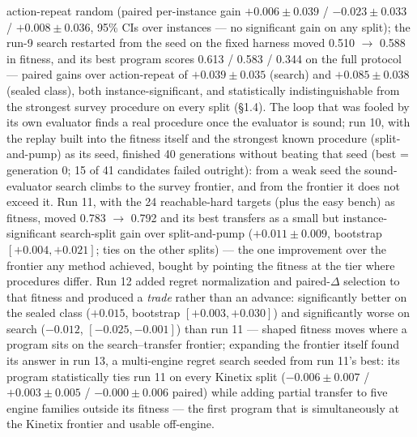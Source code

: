 action-repeat random (paired per-instance gain $+0.006\pm0.039$ / $-0.023\pm0.033$ / $+0.008\pm0.036$, 95\% CIs over instances --- no significant gain on any split); the run-9 search restarted from the seed on the fixed harness moved 0.510 $\to$ 0.588 in fitness, and its best program scores 0.613 / 0.583 / 0.344 on the full protocol --- paired gains over action-repeat of $+0.039\pm0.035$ (search) and $+0.085\pm0.038$ (sealed class), both instance-significant, and statistically indistinguishable from the strongest survey procedure on every split (\S1.4). The loop that was fooled by its own evaluator finds a real procedure once the evaluator is sound; run 10, with the replay built into the fitness itself and the strongest known procedure (split-and-pump) as its seed, finished 40 generations without beating that seed (best = generation 0; 15 of 41 candidates failed outright): from a weak seed the sound-evaluator search climbs to the survey frontier, and from the frontier it does not exceed it. Run 11, with the 24 reachable-hard targets (plus the easy bench) as fitness, moved 0.783 $\to$ 0.792 and its best transfers as a small but instance-significant search-split gain over split-and-pump ($+0.011\pm0.009$, bootstrap $[+0.004,+0.021]$; ties on the other splits) --- the one improvement over the frontier any method achieved, bought by pointing the fitness at the tier where procedures differ. Run 12 added regret normalization and paired-$\Delta$ selection to that fitness and produced a \emph{trade} rather than an advance: significantly better on the sealed class ($+0.015$, bootstrap $[+0.003,+0.030]$) and significantly worse on search ($-0.012$, $[-0.025,-0.001]$) than run 11 --- shaped fitness moves where a program sits on the search--transfer frontier; expanding the frontier itself found its answer in run 13, a multi-engine regret search seeded from run 11's best: its program statistically ties run 11 on every Kinetix split ($-0.006\pm0.007$ / $+0.003\pm0.005$ / $-0.000\pm0.006$ paired) while adding partial transfer to five engine families outside its fitness --- the first program that is simultaneously at the Kinetix frontier and usable off-engine.

